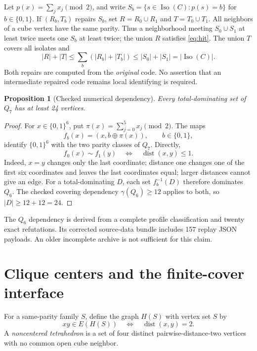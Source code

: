 \documentclass[11pt]{article}
\newtheorem{proposition}[theorem]{Proposition}
\theoremstyle{definition}\newtheorem{definition}[theorem]{Definition}
\theoremstyle{remark}\newtheorem{remark}[theorem]{Remark}
\newcommand{\Q}{Q}
\newcommand{\dist}{\operatorname{dist}}
\newcommand{\iso}{\operatorname{Iso}}
\newcommand{\card}[1]{\lvert #1\rvert}
\newcommand{\bits}{\{0,1\}}
\begin{document}
Let $p(x)=\sum_j x_j\pmod2$, and write $S_b=\{s\in\iso(C):p(s)=b\}$ for $b\in\{0,1\}$. If $(R_b,T_b)$ repairs $S_b$, set $R=R_0\cup R_1$ and $T=T_0\cup T_1$. All neighbors of a cube vertex have the same parity. Thus a neighborhood meeting $S_0\cup S_1$ at least twice meets one $S_b$ at least twice; the union $R$ satisfies \eqref{eq:hit}. The union $T$ covers all isolates and
\[
 \card R+\card T\le\sum_b(\card{R_b}+\card{T_b})
 \le\card{S_0}+\card{S_1}=\card{\iso(C)}.
\]
Both repairs are computed from the \emph{original} code. No assertion that an intermediate repaired code remains local identifying is required.

\begin{proposition}[Checked numerical dependency]\label{prop:total}
Every total-dominating set of $\Q_7$ has at least 24 vertices.
\end{proposition}
\begin{proof}
For $x\in\bits^6$, put $\pi(x)=\sum_{j=0}^5x_j\pmod2$. The maps
\[
 f_b(x)=(x,b\mathbin{\oplus}\pi(x)),\qquad b\in\{0,1\},
\]
identify $\bits^6$ with the two parity classes of $\Q_7$. Directly,
\[
 f_0(x)\sim f_1(y)\quad\Longleftrightarrow\quad\dist(x,y)\le1.
\]
Indeed, $x=y$ changes only the last coordinate; distance one changes one of the first six coordinates and leaves the last coordinates equal; larger distances cannot give an edge. For a total-dominating $D$, each set $f_b^{-1}(D)$ therefore dominates $\Q_6$. The checked covering dependency $\gamma(\Q_6)\ge12$ applies to both, so $\card D\ge12+12=24$.
\end{proof}
The $\Q_6$ dependency is derived from a complete profile classification and twenty exact refutations. Its corrected source-data bundle includes 157 replay JSON payloads. An older incomplete archive is not sufficient for this claim.

\section{Clique centers and the finite-cover interface}
For a same-parity family $S$, define the graph $H(S)$ with vertex set $S$ by
\[
 xy\in E(H(S))\quad\Longleftrightarrow\quad\dist(x,y)=2.
\]
A \emph{noncentered tetrahedron} is a set of four distinct pairwise-distance-two vertices with no common open cube neighbor.
\end{document}
